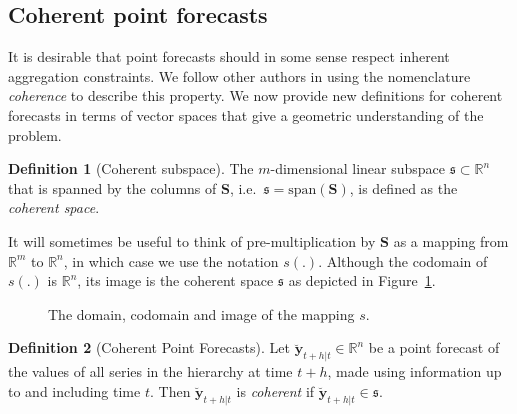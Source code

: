 \documentclass[12pt]{article}
\theoremstyle{definition}
\newtheorem{definition}{Definition}[section]
\begin{document}
	\subsection{Coherent point forecasts}\label{sec:cohpointf}
	
	It is desirable that point forecasts should in some sense respect inherent aggregation constraints. We follow other authors \citep{Wickramasuriya2017, FPP2018} in using the nomenclature \emph{coherence} to describe this property.  We now provide new definitions for coherent forecasts in terms of vector spaces that give a geometric understanding of the problem.
	
	\begin{definition}[Coherent subspace]\label{def:cohspace}
		The $m$-dimensional linear subspace $\mathfrak{s}\subset \mathbb{R}^n$ that is spanned by the columns of $\bm{S}$, i.e.\ $\mathfrak{s}=\text{span}(\bm{S})$, is defined as the \emph{coherent space}.
	\end{definition}
	
	It will sometimes be useful to think of pre-multiplication by $\bm{S}$ as a mapping from $\mathbb{R}^m$ to $\mathbb{R}^n$, in which case we use the notation $s(.)$. Although the codomain of $s(.)$ is $\mathbb{R}^n$, its image is the coherent space $\mathfrak{s}$ as depicted in Figure~\ref{fig2}.
	
	\begin{figure}[H]
		\begin{center}
		\end{center}
		\caption{The domain, codomain and image of the mapping $s$.}\label{fig2}
	\end{figure}
	
	\begin{definition}[Coherent Point Forecasts]\label{def:cohpoint}
		Let $\breve{\bm{y}}_{t+h|t} \in \mathbb{R}^n$ be a point forecast of the values of all series in the hierarchy at time $t+h$, made using information up to and including time $t$. Then $\breve{\bm{y}}_{t+h|t}$ is \emph{coherent} if $\breve{\bm{y}}_{t+h|t} \in \mathfrak{s}$.
	\end{definition}
	
\end{document}
